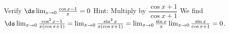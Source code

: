 {Verify $\ds\lim_{x\to 0} \frac{\cos x -1}{x} =0$ \quad Hint: Multiply by $\dfrac{\cos x +1}{\cos x +1}$}
{We find $\ds\lim_{x\to0}\frac{\cos^2 x-1}{x(\cos x+1)}=\lim_{x\to0}\frac{\sin^2x}{x(\cos x+1)}=\lim_{x\to0}\frac{\sin x}x\lim_{x\to0}\frac{\sin x}{\cos x+1}=0$.}

